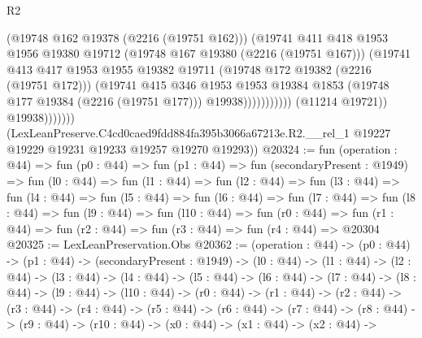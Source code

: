 \begin{lexlean}{R2}
\begin{coremodule}
                                      (@19748 @162 @19378 (@2216 (@19751 @162)))
                                      (@19741
                                        @411
                                        @418
                                        @1953
                                        @1956
                                        @19380
                                        @19712
                                        (@19748 @167 @19380 (@2216 (@19751 @167)))
                                        (@19741
                                          @413
                                          @417
                                          @1953
                                          @1955
                                          @19382
                                          @19711
                                          (@19748 @172 @19382 (@2216 (@19751 @172)))
                                          (@19741
                                            @415
                                            @346
                                            @1953
                                            @1953
                                            @19384
                                            @1853
                                            (@19748 @177 @19384 (@2216 (@19751 @177)))
                                            @19938)))))))))))
                      (@11214 @19721))
                    @19938)))))))
      (LexLeanPreserve.C4cd0caed9fdd884fa395b3066a67213e.R2.__rel_1
        @19227
        @19229
        @19231
        @19233
        @19257
        @19270
        @19293))
@20324 := fun (operation : @44) =>
  fun (p0 : @44) =>
  fun (p1 : @44) =>
  fun (secondaryPresent : @1949) =>
  fun (l0 : @44) =>
  fun (l1 : @44) =>
  fun (l2 : @44) =>
  fun (l3 : @44) =>
  fun (l4 : @44) =>
  fun (l5 : @44) =>
  fun (l6 : @44) =>
  fun (l7 : @44) =>
  fun (l8 : @44) =>
  fun (l9 : @44) =>
  fun (l10 : @44) =>
  fun (r0 : @44) => fun (r1 : @44) => fun (r2 : @44) => fun (r3 : @44) => fun (r4 : @44) => @20304
@20325 := LexLeanPreservation.Obs
@20362 := (operation : @44) ->
  (p0 : @44) ->
  (p1 : @44) ->
  (secondaryPresent : @1949) ->
  (l0 : @44) ->
  (l1 : @44) ->
  (l2 : @44) ->
  (l3 : @44) ->
  (l4 : @44) ->
  (l5 : @44) ->
  (l6 : @44) ->
  (l7 : @44) ->
  (l8 : @44) ->
  (l9 : @44) ->
  (l10 : @44) ->
  (r0 : @44) ->
  (r1 : @44) ->
  (r2 : @44) ->
  (r3 : @44) ->
  (r4 : @44) ->
  (r5 : @44) ->
  (r6 : @44) ->
  (r7 : @44) ->
  (r8 : @44) ->
  (r9 : @44) ->
  (r10 : @44) ->
  (x0 : @44) ->
  (x1 : @44) ->
  (x2 : @44) ->

\end{coremodule}
\end{lexlean}
